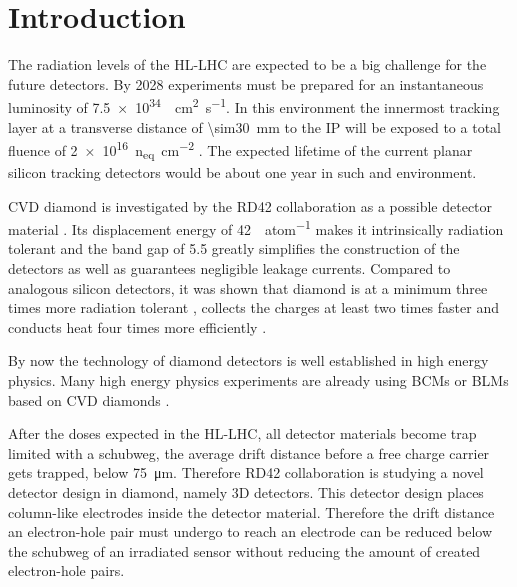\section{Introduction}
The radiation levels of the \ac{HL-LHC} are expected to be a big challenge for the future detectors. By 2028 experiments must be prepared for an instantaneous luminosity of \SI{7.5e34}{\per\centi\meter\squared\per\second}. In this environment the innermost tracking layer at a transverse distance of \SI{\sim30}{\milli\meter} to the \acl{IP} will be exposed to a total fluence of \SI{2e16}{n_{eq}\per\centi\meter^2} %
\cite{dose}. The expected lifetime of the current planar silicon tracking detectors would be about one year in such and environment.\par
\ac{CVD} diamond is investigated by the RD42 collaboration as a possible detector material \cite{rd42}. Its displacement energy of \SI{42}{\ev\per atom} makes it intrinsically radiation tolerant and the band gap of \SI{5.5}{\ev} greatly simplifies the construction of the detectors as well as guarantees negligible leakage currents. Compared to analogous silicon detectors, it was shown that diamond is at a minimum three times more radiation tolerant \cite{deboer}, collects the charges at least two times faster \cite{pernegger} and conducts heat four times more efficiently \cite{zhao}.\par
By now the technology of diamond detectors is well established in high energy physics. Many high energy physics experiments are already using \aclp{BCM} or \aclp{BLM} based on \ac{CVD} diamonds \cite{babar, bcm, dbm1}.\par
After the doses expected in the \ac{HL-LHC}, all detector materials become trap limited with a schubweg, the average drift distance before a free charge carrier gets trapped, below \SI{75}{\micro\meter}. 
Therefore RD42 collaboration is studying a novel detector design in diamond, namely 3D detectors. This detector design places column-like electrodes inside the detector material. Therefore the drift distance an electron-hole pair must undergo to reach an electrode can be reduced below the schubweg of an irradiated sensor without reducing the amount of created electron-hole pairs.
